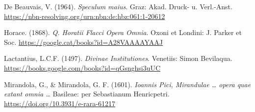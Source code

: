 \documentclass[
]{article}
\begin{document}
De Beauvais, V. (1964). \emph{Speculum maius}. Graz: Akad. Druck- u.
Verl.-Anst. \url{https://nbn-resolving.org/urn:nbn:de:hbz:061:1-20612}

Horace. (1868). \emph{Q. Horatii Flacci Opera Omnia}. Oxoni et Londini:
J. Parker et Soc. \url{https://google.cat/books?id=A28VAAAAYAAJ}

Lactantius, L.C.F. (1497). \emph{Divinae Institutiones}. Venetiis: Simon
Bevilaqua. \url{https://books.google.com/books?id=qGsnghsi3uUC}

Mirandola, G., \& Mirandola, G. F. (1601). \emph{Ioannis Pici,
Mirandulae \ldots{} opera quae extant omnia \ldots{}} Basileae: per
Sebastianum Henricpetri. \url{https://doi.org/10.3931/e-rara-61217}
\end{document}
